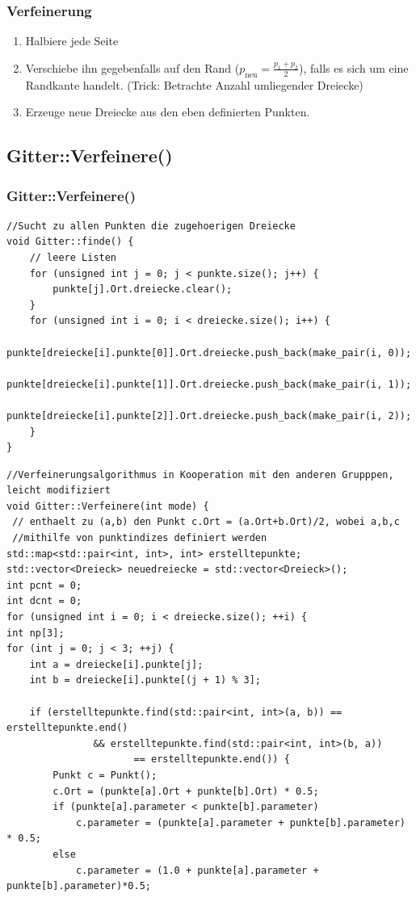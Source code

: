 \documentclass{beamer}
\begin{document}
\begin{frame}
\frametitle{Verfeinerung}
\begin{enumerate}
\item Halbiere jede Seite
\item Verschiebe ihn gegebenfalls auf den Rand ($p_{\text{neu}} =\frac{p_1+p_2}{2}$), falls es sich um eine Randkante handelt. (Trick: Betrachte Anzahl umliegender Dreiecke)
\item Erzeuge neue Dreiecke aus den eben definierten Punkten.
\end{enumerate}
\end{frame}

\subsection{Gitter::Verfeinere()}
\begin{frame}[fragile]
\frametitle{Gitter::Verfeinere()}

\begin{lstlisting}
//Sucht zu allen Punkten die zugehoerigen Dreiecke
void Gitter::finde() {
    // leere Listen
    for (unsigned int j = 0; j < punkte.size(); j++) {
        punkte[j].Ort.dreiecke.clear();
    }
    for (unsigned int i = 0; i < dreiecke.size(); i++) {
        punkte[dreiecke[i].punkte[0]].Ort.dreiecke.push_back(make_pair(i, 0));
        punkte[dreiecke[i].punkte[1]].Ort.dreiecke.push_back(make_pair(i, 1));
        punkte[dreiecke[i].punkte[2]].Ort.dreiecke.push_back(make_pair(i, 2));
    }
}
\end{lstlisting}
\end{frame}

\begin{frame}[fragile]
\begin{lstlisting}
//Verfeinerungsalgorithmus in Kooperation mit den anderen Grupppen, leicht modifiziert
void Gitter::Verfeinere(int mode) {
 // enthaelt zu (a,b) den Punkt c.Ort = (a.Ort+b.Ort)/2, wobei a,b,c 
 //mithilfe von punktindizes definiert werden
std::map<std::pair<int, int>, int> erstelltepunkte;
std::vector<Dreieck> neuedreiecke = std::vector<Dreieck>();
int pcnt = 0;
int dcnt = 0;
for (unsigned int i = 0; i < dreiecke.size(); ++i) {
int np[3];
for (int j = 0; j < 3; ++j) {
    int a = dreiecke[i].punkte[j];
    int b = dreiecke[i].punkte[(j + 1) % 3];

    if (erstelltepunkte.find(std::pair<int, int>(a, b)) == erstelltepunkte.end()
               && erstelltepunkte.find(std::pair<int, int>(b, a))
                      == erstelltepunkte.end()) {
        Punkt c = Punkt();
        c.Ort = (punkte[a].Ort + punkte[b].Ort) * 0.5;
        if (punkte[a].parameter < punkte[b].parameter)
            c.parameter = (punkte[a].parameter + punkte[b].parameter) * 0.5;
        else
            c.parameter = (1.0 + punkte[a].parameter + punkte[b].parameter)*0.5;
\end{lstlisting}
\end{frame}
\end{document}

